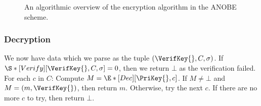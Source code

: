 \begin{frame}
  \begin{figure}
    \caption{%
      An algorithmic overview of the encryption algorithm in the \ac{ANOBE} 
      scheme.
    }\label{EncANOBE}
  \end{figure}
\end{frame}

\subsubsection{Decryption}

We now have data which we parse as the tuple \((\VerifKey{}, C, \sigma)\).
If \(\S*[Verify][\VerifKey{}, C, \sigma ] = 0\), then we return \(\bot\) as the 
verification failed.
For each \(c\) in \(C\):
Compute \(M = \E*[Dec][\PriKey{}, c ]\).
If \(M \neq \bot\) and \(M = (m, \VerifKey{})\), then return \(m\).
Otherwise, try the next \(c\).
If there are no more \(c\) to try, then return \(\bot\).

